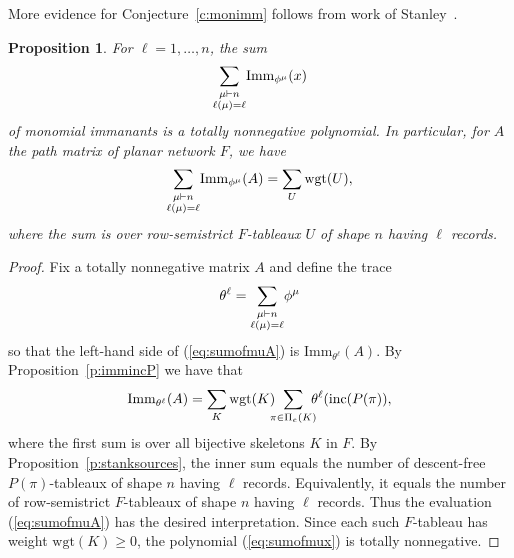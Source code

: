 \documentclass[12pt]{amsart}
\newtheorem{prop}[thm]{Proposition}
\numberwithin{equation}{section}
\newcommand{\imm}[1]{\mathrm{Imm}_{#1}}
\newcommand{\sumsb}[1]{\sum_{\substack{#1}}}  %
\newcommand{\wgt}{\mathrm{wgt}}
\newcommand{\type}{\mathrm{type}}
\newcommand{\ntnsp}{\negthinspace}
\newcommand{\nTksp}{\negthickspace\negthickspace}
\newcommand{\inc}{\mathrm{inc}}
\begin{document}
More evidence for Conjecture~\ref{c:monimm} follows from
work of Stanley~\cite{StanSymm}.  
\begin{prop}\label{p:sumofmonimms}
  For $\ell = 1,\dotsc,n$, the sum
    \begin{equation}\label{eq:sumofmux}
        \sumsb{\mu \vdash n\\\ell(\mu) = \ell} \ntnsp \imm{\phi^\mu}(x)
    \end{equation}
    of monomial immanants is a totally nonnegative polynomial.
    In particular, for $A$ the path matrix of planar network $F$, we have
    \begin{equation}\label{eq:sumofmuA}
      \sumsb{\mu \vdash n\\\ell(\mu) = \ell} \ntnsp \imm{\phi^\mu}(A) =
      \sum_U \wgt(U), 
    \end{equation}
    where the sum is over row-semistrict $F$-tableaux $U$
    of shape $n$ having $\ell$ records.
\end{prop}
\begin{proof}
  Fix a totally nonnegative matrix $A$
  and
 define the trace
  \begin{equation}%
    \theta^\ell = \sumsb{\mu \vdash n\\\ell(\mu) = \ell} \ntnsp \phi^\mu
  \end{equation}
  so that the left-hand side of (\ref{eq:sumofmuA}) is $\imm{\theta^\ell}(A)$.
  By
  Proposition~\ref{p:immincP}
  we have that
  \begin{equation*}
    \imm{\theta^\ell}(A) =
    \sum_K \wgt(K) \nTksp
    \sum_{\pi \in \Pi_e(K)} \nTksp \theta^\ell(\inc(P(\pi)),
  \end{equation*}
  where the first sum is over all bijective skeletons $K$ in $F$.
  By Proposition~\ref{p:stanksources}, the inner sum equals the
  number of
  descent-free $P(\pi)$-tableaux of shape $n$
  having $\ell$
  records.
  Equivalently, it equals the number of
  row-semistrict $F$-tableaux of shape $n$ having $\ell$
  records.
  Thus the evaluation (\ref{eq:sumofmuA}) has the desired interpretation.
  Since each such $F$-tableau has weight
  $\wgt(K) \geq 0$, 
  the polynomial (\ref{eq:sumofmux}) is totally nonnegative.  
\end{proof}
\end{document}
